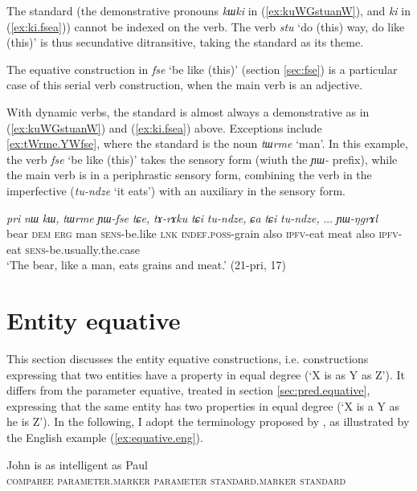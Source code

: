 \documentclass[oneside,a4paper,12pt]{article}
\newcommand{\ipa}[1]{{\phon\textit{#1}}}
\newcommand{\forme}[2]{\ipa{#1} `#2'}
\begin{document}
The standard (the demonstrative pronouns \ipa{kɯki} in (\ref{ex:kuWGstuanW}), and \ipa{ki} in (\ref{ex:ki.fsea})) cannot be indexed on the verb. The verb \forme{stu}{do (this) way, do like (this)} is thus secundative ditransitive, taking the standard as its theme. 

The equative construction in \ipa{fse} `be like (this)' (section \ref{sec:fse}) is a particular case of this serial verb construction, when the main verb is an adjective.

With dynamic verbs, the standard is almost always a demonstrative as in (\ref{ex:kuWGstuanW}) and (\ref{ex:ki.fsea}) above. Exceptions include \ref{ex:tWrme.YWfse}, where the standard is the noun \forme{tɯrme}{man}. In this example, the verb \forme{fse}{be like (this)} takes the sensory form (wiuth the \ipa{ɲɯ-} prefix), while the main verb is in a periphrastic sensory form, combining  the verb in the imperfective (\ipa{tu-ndze} `it eats') with an auxiliary in the sensory form.

\begin{exe}
\ex \label{ex:tWrme.YWfse}
\gll
\ipa{pri} 	\ipa{nɯ} 	\ipa{kɯ,} \ipa{tɯrme} 	\ipa{ɲɯ-fse} 	\ipa{tɕe,} 	\ipa{tɤ-rɤku} 	\ipa{tɕi} 	\ipa{tu-ndze,} 	\ipa{ɕa} 	\ipa{tɕi} 	\ipa{tu-ndze,} ... \ipa{ɲɯ-ŋgrɤl} \\
bear \textsc{dem} \textsc{erg} man \textsc{sens}-be.like \textsc{lnk} \textsc{indef.poss}-grain also \textsc{ipfv}-eat meat also \textsc{ipfv}-eat { } \textsc{sens}-be.usually.the.case \\
\glt `The bear, like a man, eats grains and meat.' (21-pri, 17)
\end{exe}

\section{Entity equative} \label{sec:arg.equative}
This section discusses the entity equative constructions, i.e. constructions expressing that two entities have a property in equal degree (`X is as Y as Z'). It differs from the parameter equative, treated in section \ref{sec:pred.equative}, expressing that the same entity has two properties in equal degree (`X is a Y as he is Z'). In the following, I adopt the terminology proposed by \citet{haspelmath08equative}, as illustrated by the English example (\ref{ex:equative.eng}). 

\begin{exe}
\ex \label{ex:equative.eng}
\gll  John is as intelligent as Paul \\
\textsc{comparee} { } \textsc{parameter.marker} \textsc{parameter} \textsc{standard.marker} \textsc{standard}  \\
\end{exe}
\end{document}
